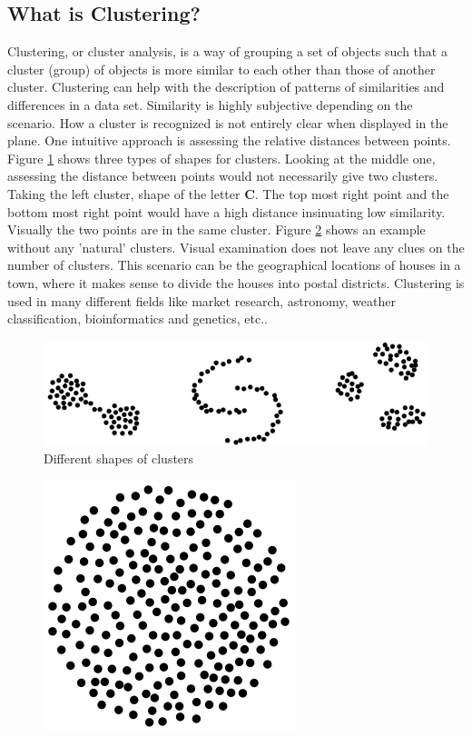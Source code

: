 \documentclass[a4paper,10pt]{article}
\theoremstyle{plain}
\theoremstyle{definition}
\begin{document}
\subsection{What is Clustering?}
Clustering, or cluster analysis, is a way of grouping a set of objects such that a cluster (group) of objects is more similar to each other than those of another cluster. Clustering can help with the description of patterns of similarities and differences in a data set. Similarity is highly subjective depending on the scenario.
How a cluster is recognized is not entirely clear when displayed in the plane. One intuitive approach is assessing the relative distances between points. Figure \ref{fig:clusterShapes} shows three types of shapes for clusters. Looking at the middle one, assessing the distance between points would not necessarily give two clusters. Taking the left cluster, shape of the letter \textbf{C}. The top most right point and the bottom most right point would have a high distance insinuating low similarity. Visually the two points are in the same cluster. 
Figure \ref{fig:noNaturalCluster} shows an example without any 'natural' clusters. Visual examination does not leave any clues on the number of clusters. This scenario can be the geographical locations of houses in a town, where it makes sense to divide the houses into postal districts. Clustering is used in many different fields like market research, astronomy, weather classification, bioinformatics and genetics, etc..
\begin{figure}[H]
	\centering
	\includegraphics[scale=0.4]{./pictures/clusterShapes.png}
	\caption{Different shapes of clusters}
	\label{fig:clusterShapes}
\end{figure}
\begin{figure}[H]
	\centering
	\includegraphics[scale=0.4]{./pictures/noNaturalCluster.png}
	\caption{}
	\label{fig:noNaturalCluster}
\end{figure}
\end{document}

